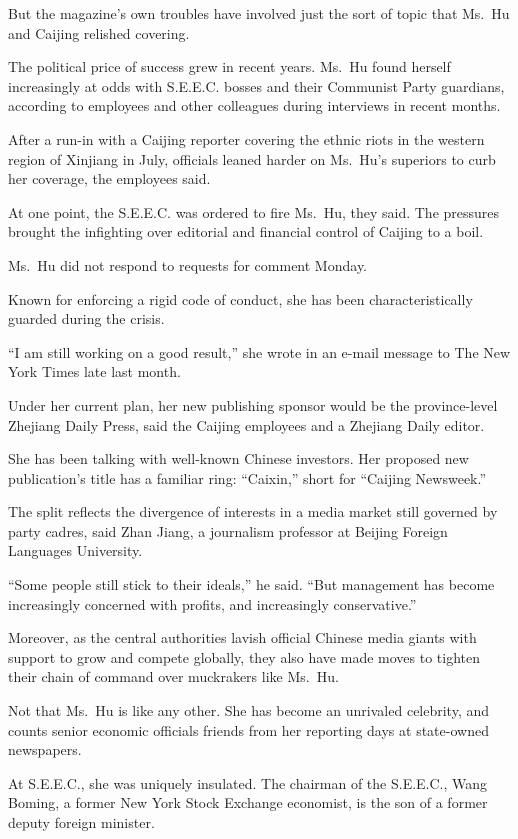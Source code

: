 ﻿\documentclass[12pt]{article}
\begin{document}
But the magazine's own troubles have involved just the sort of topic that Ms.~Hu and Caijing
relished covering.

The political price of success grew in recent years. Ms.~Hu found herself increasingly at odds with
S.E.E.C. bosses and their Communist Party guardians, according to employees and other colleagues
during interviews in recent months.

After a run-in with a Caijing reporter covering the ethnic riots in the western region of Xinjiang
in July, officials leaned harder on Ms.~Hu's superiors to curb\cite{curb} her coverage, the
employees said.

At one point, the S.E.E.C. was ordered to fire Ms.~Hu, they said. The pressures brought the
infighting over editorial and financial control of Caijing to a boil.

Ms.~Hu did not respond to requests for comment Monday.

Known for enforcing a rigid code of conduct, she has been characteristically guarded during the
crisis.

``I am still working on a good result,'' she wrote in an e-mail message to The New York Times late
last month.

Under her current plan, her new publishing sponsor would be the province-level Zhejiang Daily Press,
said the Caijing employees and a Zhejiang Daily editor.

She has been talking with well-known Chinese investors. Her proposed new publication's title has a
familiar ring: ``Caixin,'' short for ``Caijing Newsweek.''

The split reflects the divergence of interests in a media market still governed by party cadres,
said Zhan Jiang, a journalism professor at Beijing Foreign Languages University.

``Some people still stick to their ideals,'' he said. ``But management has become increasingly
concerned with profits, and increasingly conservative.''

Moreover, as the central authorities lavish official Chinese media giants with support to grow and
compete globally, they also have made moves to tighten their chain of command over muckrakers like
Ms.~Hu.

Not that Ms.~Hu is like any other. She has become an unrivaled celebrity, and counts senior economic
officials friends from her reporting days at state-owned newspapers.

At S.E.E.C., she was uniquely insulated. The chairman of the S.E.E.C., Wang Boming, a former New
York Stock Exchange economist, is the son of a former deputy foreign minister.
\end{document}
